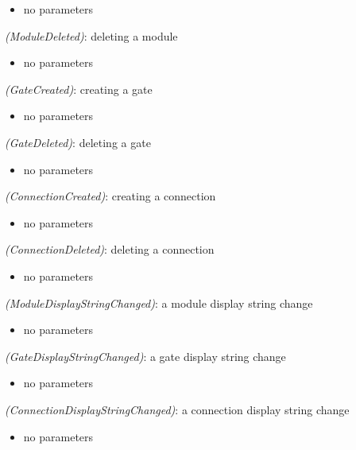 \begin{itemize}
  \item no parameters
\end{itemize}

 \textit{(ModuleDeleted)}: deleting a module

\begin{itemize}
  \item no parameters
\end{itemize}

 \textit{(GateCreated)}: creating a gate

\begin{itemize}
  \item no parameters
\end{itemize}

 \textit{(GateDeleted)}: deleting a gate

\begin{itemize}
  \item no parameters
\end{itemize}

 \textit{(ConnectionCreated)}: creating a connection

\begin{itemize}
  \item no parameters
\end{itemize}

 \textit{(ConnectionDeleted)}: deleting a connection

\begin{itemize}
  \item no parameters
\end{itemize}

 \textit{(ModuleDisplayStringChanged)}: a module display string change

\begin{itemize}
  \item no parameters
\end{itemize}

 \textit{(GateDisplayStringChanged)}: a gate display string change

\begin{itemize}
  \item no parameters
\end{itemize}

 \textit{(ConnectionDisplayStringChanged)}: a connection display string change

\begin{itemize}
  \item no parameters
\end{itemize}

